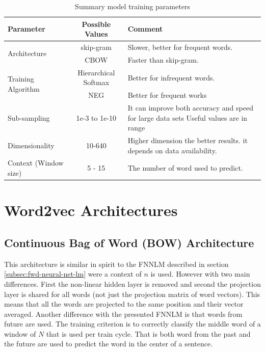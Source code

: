 \begin{table}[h]
   \centering
   \caption{Summary model training parameters} 
   \label{tab:word2_vec_parameters}
   
   \small
   \begin{tabular}{ |l|c|p{5cm}| }
   \hline           
    Parameter &  Possible Values & Comment \\  \hline           
    \multirow{2}{*}{Architecture}  & skip-gram  & Slower, better for frequent
    words. \\ 
    \cline{2-3}
    & \ac{CBOW}  &  Faster than skip-gram. \\ \hline
    \multirow{2}{*}{Training Algorithm}  & Hierarchical Softmax  & Better for infrequent words.   \\ 
    \cline{2-3}
    & \ac{NEG} & Better for frequent works \\ \hline
    Sub-sampling  & 1e-3 to 1e-10  &  It  can improve both accuracy and speed for large data
    sets Useful values are in range \\ \hline
    Dimensionality  & 10-640 & Higher dimension the better results. 
    it depends on data availability.  \\ \hline
    Context (Window size)  & 5 - 15 & The number of word used to predict. \\ \hline

    
\end{tabular}
\end{table}


\section{Word2vec Architectures}
\label{sec:word2v-architectures}


\subsection{Continuous Bag of Word (BOW) Architecture}

This architecture is similar in spirit to the  \ac{FNNLM} described in section
\ref{subsec:fwd-neural-net-lm} were a context of $n$ is used. However with two main differences. First the
non-linear hidden layer is removed and second the projection layer is shared for
all words (not just the projection matrix of word vectors). This means that
all the words are projected to the same position and their vector averaged.
Another difference with the presented \ac{FNNLM}  is that words from future are used. 
The training criterion is to correctly classify the middle word of a window
of $N$ that is used per train cycle. That is both word from the past and the
future are used to predict the word in the center of a sentence.


